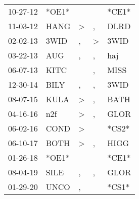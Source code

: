 \begin{supertabular}{p{0.07\textwidth}p{0.06\textwidth}p{0.02\textwidth}p{0.02\textwidth}p{0.06\textwidth}}
 10-27-12\textsuperscript{} &                   *OE1* &               &               &                   *CE1* \\
 11-03-12\textsuperscript{} &  HANG\textsuperscript{} &  \textgreater &             , &  DLRD\textsuperscript{} \\
 02-02-13\textsuperscript{} &  3WID\textsuperscript{} &             , &  \textgreater &  3WID\textsuperscript{} \\
 03-22-13\textsuperscript{} &   AUG\textsuperscript{} &             , &             , &   haj\textsuperscript{} \\
 06-07-13\textsuperscript{} &  KITC\textsuperscript{} &               &             , &  MISS\textsuperscript{} \\
 12-30-14\textsuperscript{} &  BILY\textsuperscript{} &             , &             , &  3WID\textsuperscript{} \\
 08-07-15\textsuperscript{} &  KULA\textsuperscript{} &  \textgreater &             , &  BATH\textsuperscript{} \\
 04-16-16\textsuperscript{} &   n2f\textsuperscript{} &  \textgreater &             , &  GLOR\textsuperscript{} \\
 06-02-16\textsuperscript{} &  COND\textsuperscript{} &  \textgreater &               &                   *CS2* \\
 06-10-17\textsuperscript{} &  BOTH\textsuperscript{} &  \textgreater &             , &  HIGG\textsuperscript{} \\
 01-26-18\textsuperscript{} &                   *OE1* &               &               &                   *CE1* \\
 08-04-19\textsuperscript{} &  SILE\textsuperscript{} &             , &             , &  GLOR\textsuperscript{} \\
 01-29-20\textsuperscript{} &  UNCO\textsuperscript{} &             , &               &                   *CS1* \\
\end{supertabular}
